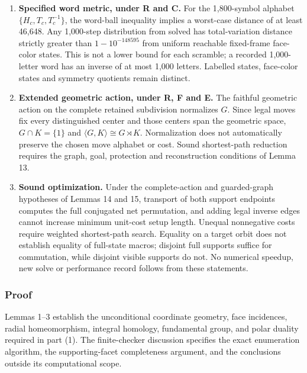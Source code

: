\documentclass[
  10pt,
  a4paper,
]{article}
\begin{document}
\begin{enumerate}
  With the separate pure-controller hypothesis C, the supported action
  contains \(A_{3600}\times A_{2400}\times A_{7200}^{7}\) and yields the
  balanced fixed-frame color lower bound \(B\) of Lemma 10. Neither
  bound determines the exact order of \(G\) or proves sufficiency of the
  listed invariants.
\item
  \textbf{Specified word metric, under R and C.} For the 1,800-symbol
  alphabet \(\{H_c,T_c,T_c^{-1}\}\), the word-ball inequality implies a
  worst-case distance of at least 46,648. Any 1,000-step distribution
  from solved has total-variation distance strictly greater than
  \(1-10^{-148595}\) from uniform reachable fixed-frame face-color
  states. This is not a lower bound for each scramble; a recorded
  1,000-letter word has an inverse of at most 1,000 letters. Labelled
  states, face-color states and symmetry quotients remain distinct.
\item
  \textbf{Extended geometric action, under R, F and E.} The faithful
  geometric action on the complete retained subdivision normalizes
  \(G\). Since legal moves fix every distinguished center and those
  centers span the geometric space, \(G\cap K=\{1\}\) and
  \(\langle G,K\rangle\cong G\rtimes K\). Normalization does not
  automatically preserve the chosen move alphabet or cost. Sound
  shortest-path reduction requires the graph, goal, protection and
  reconstruction conditions of Lemma 13.
\item
  \textbf{Sound optimization.} Under the complete-action and
  guarded-graph hypotheses of Lemmas 14 and 15, transport of both
  support endpoints computes the full conjugated net permutation, and
  adding legal inverse edges cannot increase minimum unit-cost setup
  length. Unequal nonnegative costs require weighted shortest-path
  search. Equality on a target orbit does not establish equality of
  full-state macros; disjoint full supports suffice for commutation,
  while disjoint visible supports do not. No numerical speedup, new
  solve or performance record follows from these statements.
\end{enumerate}

\subsubsection{Proof}\label{proof-15}

Lemmas 1--3 establish the unconditional coordinate geometry, face
incidences, radial homeomorphism, integral homology, fundamental group,
and polar duality required in part (1). The finite-checker discussion
specifies the exact enumeration algorithm, the supporting-facet
completeness argument, and the conclusions outside its computational
scope.
\end{document}
